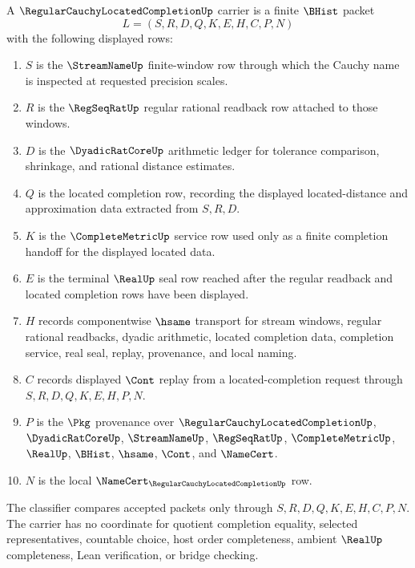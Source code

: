 \begin{definition}
\label{def:regular-cauchy-located-completion-carrier}
A $\RegularCauchyLocatedCompletionUp$ carrier is a finite $\BHist$ packet
$$
L=(S,R,D,Q,K,E,H,C,P,N)
$$
with the following displayed rows:
\begin{enumerate}
\item $S$ is the $\StreamNameUp$ finite-window row through which the Cauchy name is inspected at requested precision scales.
\item $R$ is the $\RegSeqRatUp$ regular rational readback row attached to those windows.
\item $D$ is the $\DyadicRatCoreUp$ arithmetic ledger for tolerance comparison, shrinkage, and rational distance estimates.
\item $Q$ is the located completion row, recording the displayed located-distance and approximation data extracted from $S,R,D$.
\item $K$ is the $\CompleteMetricUp$ service row used only as a finite completion handoff for the displayed located data.
\item $E$ is the terminal $\RealUp$ seal row reached after the regular readback and located completion rows have been displayed.
\item $H$ records componentwise $\hsame$ transport for stream windows, regular rational readbacks, dyadic arithmetic, located completion data, completion service, real seal, replay, provenance, and local naming.
\item $C$ records displayed $\Cont$ replay from a located-completion request through $S,R,D,Q,K,E,H,P,N$.
\item $P$ is the $\Pkg$ provenance over $\RegularCauchyLocatedCompletionUp$, $\DyadicRatCoreUp$, $\StreamNameUp$, $\RegSeqRatUp$, $\CompleteMetricUp$, $\RealUp$, $\BHist$, $\hsame$, $\Cont$, and $\NameCert$.
\item $N$ is the local $\NameCert_{\RegularCauchyLocatedCompletionUp}$ row.
\end{enumerate}
The classifier compares accepted packets only through $S,R,D,Q,K,E,H,C,P,N$. The carrier has no coordinate for quotient completion equality, selected representatives, countable choice, host order completeness, ambient $\RealUp$ completeness, Lean verification, or bridge checking.
\end{definition}

